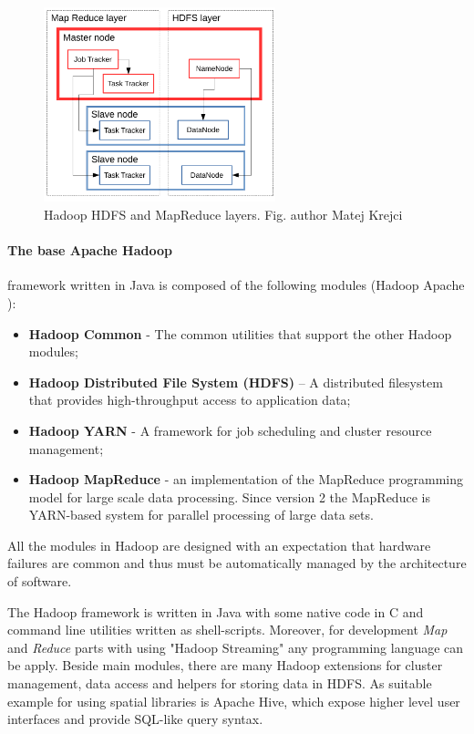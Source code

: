 \documentclass[a4paper,12pt,oneside]{report}
\begin{document}
	\begin{figure}[!htbp]
		\centering
		\includegraphics[width=0.6\textwidth]{./img/schema2.pdf}
		\caption[Hadoop architecture2]{\centering Hadoop HDFS and MapReduce layers. Fig. author Matej Krejci}
	\end{figure} 
	
	
	
	\paragraph*{The base Apache Hadoop}framework written in Java is composed of the
	following modules (Hadoop Apache \cite{hadoop_web}):
	\begin{itemize}
		\item \textbf{Hadoop Common} - The common utilities that support the other
		Hadoop modules;
		\item \textbf{Hadoop Distributed File System (HDFS)} – A distributed filesystem
		that provides
		high-throughput access to application data;
		\item \textbf{Hadoop YARN} - A framework for job scheduling and cluster resource
		management;
		\item \textbf{Hadoop MapReduce} - an implementation of the MapReduce programming
		model 
		for large scale data processing. Since version 2 the MapReduce is YARN-based system
		 for parallel processing of large data sets.
	\end{itemize}
	All the modules in Hadoop are designed with an expectation that hardware failures
	are common and thus 
	must be automatically managed by the architecture of  software.
	
	The Hadoop framework is written in Java with some native code in C and command
	line utilities written 
	as shell-scripts. Moreover, for development \textit{Map} and \textit{Reduce}
	parts  
	with using "Hadoop Streaming" any programming language can be apply. 
	Beside main modules, there are many Hadoop extensions for cluster management,
	data access and helpers for storing data in HDFS. As suitable example for using spatial libraries is Apache Hive, 
	which expose higher level user interfaces and provide SQL-like query syntax. 
	
\end{document}
